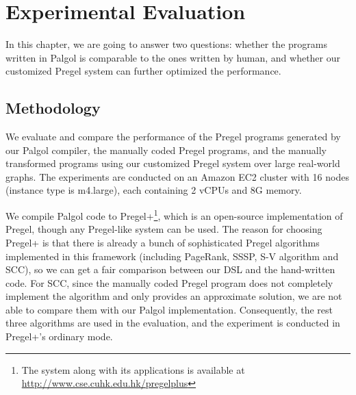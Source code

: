 \documentclass{sokendai_thesis} %
\begin{document}



\chapter{Experimental Evaluation}
\label{sec:evaluation}

In this chapter, we are going to answer two questions: whether the programs written in Palgol is comparable to the ones written by human, and whether our customized Pregel system can further optimized the performance.

\section{Methodology}

We evaluate and compare the performance of the Pregel programs generated by our Palgol compiler, the manually coded Pregel programs, and the manually transformed programs using our customized Pregel system over large real-world graphs.
The experiments are conducted on an Amazon EC2 cluster with 16 nodes (instance type is m4.large), each containing 2 vCPUs and 8G memory.

We compile Palgol code to Pregel+\footnote{The system along with its applications is available at \url{http://www.cse.cuhk.edu.hk/pregelplus}}, which is an open-source implementation of Pregel, though any Pregel-like system can be used.
The reason for choosing Pregel+ is that there is already a bunch of sophisticated Pregel algorithms implemented in this framework (including PageRank, SSSP, S-V algorithm and SCC), so we can get a fair comparison between our DSL and the hand-written code.
For SCC, since the manually coded Pregel program does not completely implement the algorithm and only provides an approximate solution, we are not able to compare them with our Palgol implementation.
Consequently, the rest three algorithms are used in the evaluation, and the experiment is conducted in Pregel+'s ordinary mode.
\end{document}

